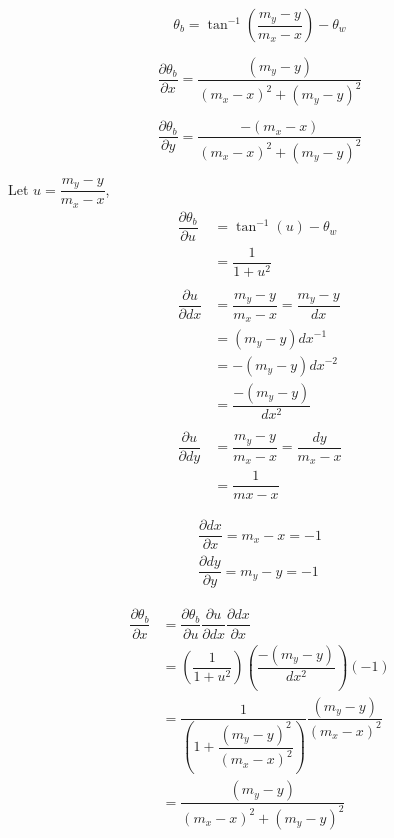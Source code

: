 \begin{equation}
  \boxed{
    \theta_{b} = \tan^{-1} \left( \dfrac{m_y - y}{m_x - x} \right) - \theta_{w}
  }
\end{equation}

\begin{equation}
  \boxed{
    \dfrac{\partial \theta_b}{\partial x}
      = \dfrac{(m_y - y)}{(m_x - x)^{2} + (m_y - y)^2}
  }
\end{equation}

\begin{equation}
  \boxed{
    \dfrac{\partial \theta_b}{\partial y}
      = \dfrac{-(m_x - x)}{(m_x - x)^2 + (m_y - y)^2}
  }
\end{equation}


Let $u = \dfrac{m_y - y}{m_x - x}$,
%
\begin{align}
  \dfrac{\partial \theta_{b}}{\partial u}
  &= \tan^{-1} (u) - \theta_{w} \nonumber \\
  &= \dfrac{1}{1 + u^2} \\
  \nonumber \\
  \dfrac{\partial u}{\partial dx}
  &= \dfrac{m_y - y}{m_x - x} = \dfrac{m_y - y}{dx} \nonumber \\
  &= (m_y - y) dx^{-1} \nonumber \\
  &= - (m_y - y) dx^{-2} \\
  &= \dfrac{- (m_y - y)}{dx^{2}} \\
  \nonumber \\
  \dfrac{\partial u}{\partial dy}
  &= \dfrac{m_y - y}{m_x - x} = \dfrac{dy}{m_x - x} \nonumber \\
  &= \dfrac{1}{mx - x}
\end{align}

\begin{align}
  \dfrac{\partial dx}{\partial x} = m_x - x = -1 \\
  \dfrac{\partial dy}{\partial y} = m_y - y = -1
\end{align}

\begin{align}
  \dfrac{\partial \theta_b}{\partial x}
  &= \dfrac{\partial \theta_b}{\partial u}
    \dfrac{\partial u}{\partial dx}
    \dfrac{\partial dx}{\partial x} \nonumber \\
  &= \left( \dfrac{1}{1 + u^2} \right)
    \left( \dfrac{- (m_y - y)}{dx^{2}} \right)
    \left( -1 \right) \nonumber \\
  &= \dfrac{1}{\left(1 + \dfrac{(m_y - y)^2}{(m_x - x)^2} \right)}
    \dfrac{(m_y - y)}{(m_x - x)^{2}} \nonumber \\
  &= \dfrac{(m_y - y)}{(m_x - x)^{2} + (m_y - y)^2}
\end{align}

